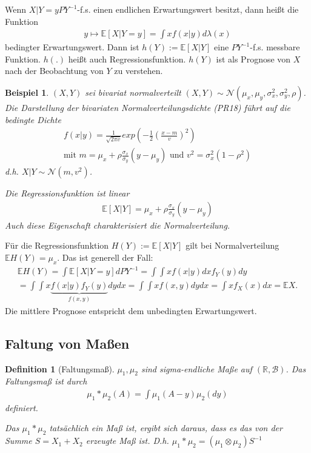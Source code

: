 \documentclass[]{article}
\newtheorem{definition}{Definition}
\newtheorem*{example}{Beispiel}
\begin{document}
Wenn $X|Y=y PY^{-1}$-f.s. einen endlichen Erwartungswert besitzt, dann heißt die Funktion
\begin{align*}
	y\mapsto \mathbb{E}[X|Y=y] = \int x f(x|y) d\lambda(x)
\end{align*} 
bedingter Erwartungswert. Dann ist $h(Y):=\mathbb{E}[X|Y]$ eine $PY^{-1}$-f.s. messbare Funktion. $h(.)$ heißt auch Regressionsfunktion. $h(Y)$ ist als Prognose von $X$ nach der Beobachtung von $Y$ zu verstehen.

\begin{example}
	$(X,Y)$ sei bivariat normalverteilt $(X,Y)\sim\mathcal{N}(\mu_x,\mu_y,\sigma_x^2,\sigma_y^2, \rho)$. Die Darstellung der bivariaten Normalverteilungsdichte (PR18) führt auf die bedingte Dichte
	\begin{align*}
		f(x|y) = \frac{1}{\sqrt{2\pi v}}exp\left(-\frac{1}{2}\left(\frac{x-m}{v}\right)^2\right)\\
		\text{mit } m = \mu_x + \rho\frac{\sigma_x}{\sigma_y}(y-\mu_y) \text{ und } v^2 = \sigma_x^2(1-\rho^2)
	\end{align*}
	d.h. $X|Y\sim\mathcal{N}(m,v^2)$.
	
	Die Regressionsfunktion ist linear
	\begin{align*}
		\mathbb{E}[X|Y] = \mu_x + \rho \frac{\sigma_x}{\sigma_y}(y-\mu_y)
	\end{align*}
	Auch diese Eigenschaft charakterisiert die Normalverteilung.
\end{example}

Für die Regressionsfunktion $H(Y):=\mathbb{E}[X|Y]$ gilt bei Normalverteilung $\mathbb{E}H(Y)=\mu_x$. Das ist generell der Fall:
\begin{align*}
	\mathbb{E}H(Y) = \int\mathbb{E}[X|Y=y]dPY^{-1} = \int\int x f(x|y) dx f_Y(y) dy\\
	= \int\int x \underbrace{f(x|y)f_Y(y)}_{f(x,y)} dy dx =	\int\int x f(x,y) dy dx = \int x f_X(x) dx = \mathbb{E}X.
\end{align*}
Die mittlere Prognose entspricht dem unbedingten Erwartungswert.

\subsection{Faltung von Maßen}
\begin{definition}[Faltungsmaß]
	$\mu_1,\mu_2$ sind sigma-endliche Maße auf $(\mathbb{R}, \mathcal{B})$. Das Faltungsmaß ist durch
	\begin{align*}
		\mu_1*\mu_2 (A) = \int \mu_1(A-y) \mu_2(dy)
	\end{align*}
	definiert.
	
	Das $\mu_1 * \mu_2$ tatsächlich ein Maß ist, ergibt sich daraus, dass es das von der Summe $S=X_1+X_2$ erzeugte Maß ist. D.h. $\mu_1 * \mu_2 = (\mu_1 \otimes \mu_2)S^{-1}$
\end{definition}
\end{document}

